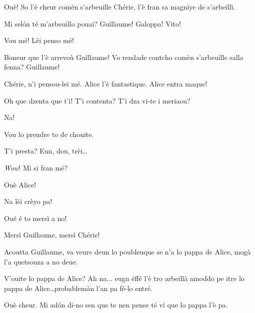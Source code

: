 \begin{drama}
{

\Alicespeaks Ouè! So l'è cheur comèn s'arbeuille Chérie, l'è fran sa magniye de s'arbeillì.

\Cheriespeaks{} Mi sel\'on té m'arbeuillo pouai? Guillaume! Galoppa! Vito!

\Guillaumespeaks Vou mé! Lèi penso mé!


}

\Cheriespeaks{} Boneur que l'è arrevoù Guillaume! Vo rendade contcho comèn s'arbeuille salla fenna? Guillaume!


\Guillaumespeaks Chérie, n’i pensou-lei mé. Alice l'è fantastique. Alice entra maque!


\Cheriespeaks Oh que dzenta que t'i! T'i contenta? T'i dza vi-te i meriaou?

\Alicespeaks Na!

\Cheriespeaks Vou lo prendre to de chouite.


\Cheriespeaks{} T'i presta? Eun, dou, trèi\ldots


\Alicespeaks \textit{Wow}! Mi si fran mé?

\Guillaumespeaks Ouè Alice!

\Alicespeaks Na lèi crèyo pa!

\Cheriespeaks Oué é to mersì a no!

\Alicespeaks Mersì Guillaume, mersì Chérie!

\Cheriespeaks Acoutta Guillaume, va veure deun lo poubleuque se n'a lo pappa de Alice, mogà l'a quetsouza a no deue.

\Guillaumespeaks{} V'ouite lo pappa de Alice? Ah na... eugn éffé l'è tro arbeillà amoddo pe itre lo pappa de Alice\ldots probablemàn l'an pa fé-lo entré.

\Cheriespeaks Ouè cheur.  Mi ad\'on di-no sen que te nen pense té vi que lo pappa l'è pa.


\end{drama}
